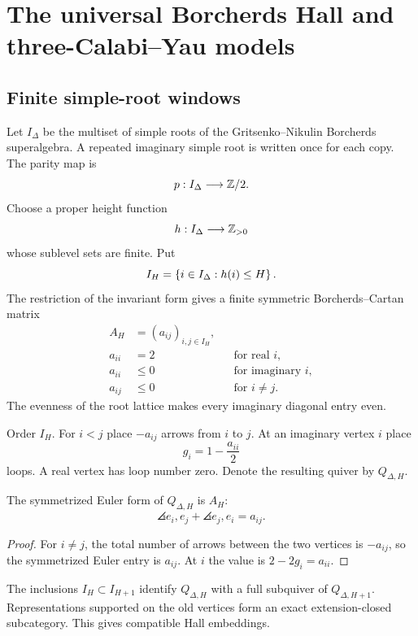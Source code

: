 \part{The universal Borcherds Hall and three-Calabi--Yau models}

\chapter{Finite simple-root windows}
Let $I_\Delta$ be the multiset of simple roots of the Gritsenko--Nikulin Borcherds superalgebra.  A repeated imaginary simple root is written once for each copy.  The parity map is
\[
 p:I_\Delta\longrightarrow\mathbb Z/2.
\]
Choose a proper height function
\[
 h:I_\Delta\longrightarrow\mathbb Z_{>0}
\]
whose sublevel sets are finite.  Put
\[
 I_H=\left\{i\in I_\Delta:h(i)\le H\right\}.
\]
The restriction of the invariant form gives a finite symmetric Borcherds--Cartan matrix
\[
\begin{aligned}
 A_H&=(a_{ij})_{i,j\in I_H},\\
 a_{ii}&=2 &&\text{for real }i,\\
 a_{ii}&\leq0 &&\text{for imaginary }i,\\
 a_{ij}&\leq0 &&\text{for }i\neq j.
\end{aligned}
\]
The evenness of the root lattice makes every imaginary diagonal entry even.

\begin{construction}
Order $I_H$.  For $i<j$ place $-a_{ij}$ arrows from $i$ to $j$.  At an imaginary vertex $i$ place
\[
 g_i=1-\frac{a_{ii}}2
\]
loops.  A real vertex has loop number zero.  Denote the resulting quiver by $Q_{\Delta,H}$.
\end{construction}

\begin{proposition}
The symmetrized Euler form of $Q_{\Delta,H}$ is $A_H$:
\[
 \angles{e_i,e_j}+\angles{e_j,e_i}=a_{ij}.
\]
\end{proposition}
\begin{proof}
For $i\ne j$, the total number of arrows between the two vertices is $-a_{ij}$, so the symmetrized Euler entry is $a_{ij}$.  At $i$ the value is $2-2g_i=a_{ii}$.
\end{proof}

The inclusions $I_H\subset I_{H+1}$ identify $Q_{\Delta,H}$ with a full subquiver of $Q_{\Delta,H+1}$.  Representations supported on the old vertices form an exact extension-closed subcategory.  This gives compatible Hall embeddings.


